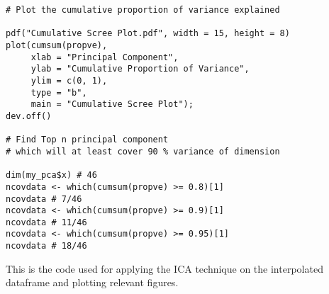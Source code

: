 \begin{verbatim}
# Plot the cumulative proportion of variance explained

pdf("Cumulative Scree Plot.pdf", width = 15, height = 8) 
plot(cumsum(propve),
     xlab = "Principal Component",
     ylab = "Cumulative Proportion of Variance",
     ylim = c(0, 1), 
     type = "b",
     main = "Cumulative Scree Plot");
dev.off()

# Find Top n principal component
# which will at least cover 90 % variance of dimension

dim(my_pca$x) # 46
ncovdata <- which(cumsum(propve) >= 0.8)[1] 
ncovdata # 7/46
ncovdata <- which(cumsum(propve) >= 0.9)[1] 
ncovdata # 11/46
ncovdata <- which(cumsum(propve) >= 0.95)[1] 
ncovdata # 18/46
\end{verbatim}

This is the code used for applying the ICA technique on the interpolated dataframe and plotting relevant figures.
